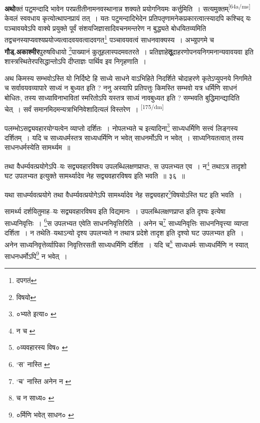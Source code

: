 \documentclass[article,12pt,a4paper]{memoir}
\begin{document}
	  \pstart \textbf{अथो}क्तं पटुमन्दादि भावेन परप्रतीतीनामनवस्थानान्न शक्यते प्रयोगनियमः कर्त्तुमिति । सत्यमुक्तम्\leavevmode\textsuperscript{\rmlatinfont\tiny [64a/ms]} केवलं स्ववधाय कृत्योत्थापनप्रायं तत् । यतः पटुमन्दादिभेदेन प्रतिपतृणामनेकप्रकारत्वात्स्यादपि कश्चिद् यः पञ्चावयवेऽपि वाक्ये प्रयुक्ते पूर्वं संशयजिज्ञासादिवचनमन्तरेण न बुद्ध्यते बोधयितव्यमिति तद्वचनस्याप्यवश्यप्रयोज्यत्वादवयवत्वादवगत\footnote{दपगतं} पञ्चावयवत्वं साधनवाक्यस्य । अभ्युपगमे च \textbf{गौड्.अकाश्मीर}पुरुषविधायो \footnote{विषयो}पाख्यानं कुतूहलास्पदमवतरते । प्रतिज्ञाहे\textbf{तू}दाहरणोपनयनिगमनान्यवावयवा इति शास्त्रस्थितेरपसिद्धान्तोऽपि दीप्ताज्ञः पार्थिव इव निगृहणाति ।
	\pend
      

	  \pstart अथ किमस्य सम्भवोऽस्ति यो निर्दिष्टे हि साध्ये साधने वाऽभिहिते निदर्शिते चोदाहरणे कृतेऽप्युपनये निगमिते च सर्वावयवव्यापारे साध्यं न बुध्यत इति ? ननु अस्यापि प्रतिपत्तुः किमस्ति सम्भवो यत्र धर्मिणि साधनं बोधितः, तस्य साध्याविनाभावितां स्मरितोऽपि यस्तत्र साध्यं नावबुध्यत इति ? सम्भवति बुद्धिमान्द्यादिति चेत् । सर्वं समानमिदमन्यत्राभिनिवेशादित्यलं विस्तरेण ।
	\pend
      \leavevmode\textsuperscript{\rmlatinfont\tiny [175/dm]}

	  \pstart पलम्भोऽसद्व्यवहारयोग्यत्वेन व्याप्तो दर्शितः । नोपलभ्यते च इत्यादिना\footnote{०भ्यते इत्या० \cite{dp-msA} \cite{dp-msB} \cite{dp-edP} \cite{dp-edH} \cite{dp-edN}} साध्यधर्मिणि सत्त्वं लिङ्गस्य दर्शितम् । यदि च साध्यधर्मस्तत्र साध्यधर्मिणि न भवेत् साधनर्मोऽपि न भवेत् । साध्यनियतत्वात् तस्य साधनधर्मस्येति सामर्थ्यम ॥
	\pend
       

	  \pstart तथा वैधर्म्यवत्प्रयोगेऽपि--यः सद्व्यवहारविषय उपलब्धिलक्षणप्राप्तः, स उपलभ्यत एव । न\footnote{न च \cite{dp-msC}} तथाऽत्र तादृशो घट उपलभ्यत इत्युक्ते सामर्थ्यादेव नेह सद्व्यवहारविषय इति भवति ॥ ३६ ॥
	\pend
       

	  \pstart यथा साधर्म्यवत्प्रयोगे तथा वैधर्म्यवत्प्रयोगेऽपि सामर्थ्यादेव नेह सद्व्यवहार\footnote{०व्यवहारस्य विष० \cite{dp-msC} \cite{dp-msD}}विषयोऽस्ति घट इति भवति ।
	\pend
       

	  \pstart सामर्थ्य दर्शयितुमाह--यः सद्व्यवहारविषय इति विद्यमानः । उपलब्धिलक्षणप्राप्त इति दृश्यः इत्येषा साध्यनिवृत्तिः । \footnote{‘स’ नास्ति \cite{dp-msA} \cite{dp-msB} \cite{dp-msC} \cite{dp-msD} \cite{dp-edP} \cite{dp-edH}}स उपलभ्यत एवेति साधननिवृत्तिरिति । अनेन च\footnote{‘च’ नास्ति \cite{dp-msC} \cite{dp-edE} अनेन न \cite{dp-edH}} साध्यनिवृत्तिः साधननिवृत्त्या व्याप्ता दर्शिता । न तथेति--यथाऽन्यो दृश्य उपलभ्यते न तथात्र प्रदेशे तादृश इति दृश्यो घट उपलभ्यत इति । अनेन साध्यनिवृत्तेर्व्यापिका निवृत्तिरसती साध्यधर्मिणि दर्शिता । यदि च\footnote{च न साध्य० \cite{dp-msA} \cite{dp-msB} \cite{dp-edP} \cite{dp-edH} \cite{dp-edN}} साध्यधर्मः साध्यधर्मिणि न स्यात् साधनधर्मोऽपि\footnote{०र्मिणि भवेत् साधन० \cite{dp-msA} \cite{dp-msB} \cite{dp-edP} \cite{dp-edH} \cite{dp-edE} \cite{dp-edN}} न भवेत् ।
	\pend
      
\end{document}

